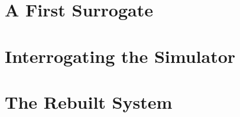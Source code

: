 \documentclass[12pt]{book}
\begin{document}
\listoffigures

\listoftables


\mainmatter


\part{A First Surrogate}










\part{Interrogating the Simulator}




\part{The Rebuilt System}







\backmatter

\printbibliography[heading=bibintoc]
\end{document}
